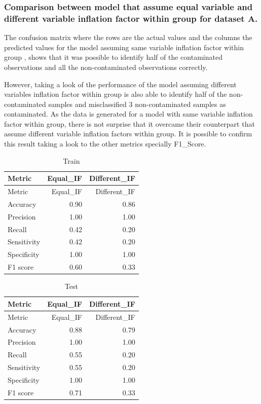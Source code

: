 \documentclass[
]{article}
\begin{document}
\hypertarget{comparison-between-model-that-assume-equal-variable-and-different-variable-inflation-factor-within-group-for-dataset-a.}{%
\subsubsection{Comparison between model that assume equal variable and
different variable inflation factor within group for dataset
A.}\label{comparison-between-model-that-assume-equal-variable-and-different-variable-inflation-factor-within-group-for-dataset-a.}}

The confusion matrix where the rows are the actual values and the
columns the predicted values for the model assuming same variable
inflation factor within group , shows that it was possible to identify
half of the contaminated observations and all the non-contaminated
observations correctly.

However, taking a look of the performance of the model assuming
different variables inflation factor within group is also able to
identify half of the non-contaminated samples and misclassified \(3\)
non-contaminated samples as contaminated. As the data is generated for a
model with same variable inflation factor within group, there is not
surprise that it overcame their counterpart that assume different
variable inflation factors within group. It is possible to confirm this
result taking a look to the other metrics specially F1\_Score.

\begin{longtable}[]{@{}lrr@{}}
\caption{Train}\tabularnewline
\toprule\noalign{}
Metric & Equal\_IF & Different\_IF \\
\midrule\noalign{}
\endfirsthead
\toprule\noalign{}
Metric & Equal\_IF & Different\_IF \\
\midrule\noalign{}
\endhead
\bottomrule\noalign{}
\endlastfoot
Accuracy & 0.90 & 0.86 \\
Precision & 1.00 & 1.00 \\
Recall & 0.42 & 0.20 \\
Sensitivity & 0.42 & 0.20 \\
Specificity & 1.00 & 1.00 \\
F1 score & 0.60 & 0.33 \\
\end{longtable}

\begin{longtable}[]{@{}lrr@{}}
\caption{Test}\tabularnewline
\toprule\noalign{}
Metric & Equal\_IF & Different\_IF \\
\midrule\noalign{}
\endfirsthead
\toprule\noalign{}
Metric & Equal\_IF & Different\_IF \\
\midrule\noalign{}
\endhead
\bottomrule\noalign{}
\endlastfoot
Accuracy & 0.88 & 0.79 \\
Precision & 1.00 & 1.00 \\
Recall & 0.55 & 0.20 \\
Sensitivity & 0.55 & 0.20 \\
Specificity & 1.00 & 1.00 \\
F1 score & 0.71 & 0.33 \\
\end{longtable}
\end{document}
